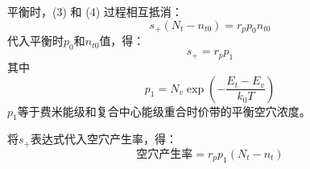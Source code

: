 平衡时，(3) 和 (4) 过程相互抵消：
\begin{equation}
    s_+(N_t-n_{t0})=r_pp_0n_{t0}
\end{equation}
代入平衡时$p_0$和$n_{t0}$值，得：
\begin{equation}
    s_+=r_pp_1
\end{equation}
其中
\begin{equation}
    p_1=N_v\exp{\left(-\frac{E_t-E_v}{k_0T}\right)}
\end{equation}
$p_1$等于费米能级和复合中心能级重合时价带的平衡空穴浓度。

将$s_+$表达式代入空穴产生率，得：
\begin{equation}
    \text{空穴产生率}=r_pp_1(N_t-n_t)
\end{equation}





